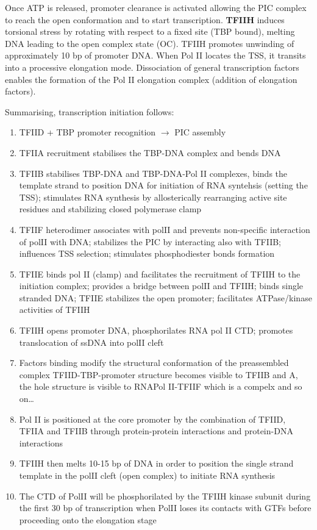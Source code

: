 Once ATP is released, promoter clearance is activated allowing the PIC complex to reach the open conformation and to start transcription. \textbf{TFIIH} induces torsional stress by rotating with respect to a fixed site (TBP bound), melting DNA leading to the open complex state (OC). TFIIH promotes unwinding of approximately 10 bp of promoter DNA. When Pol II locates the TSS, it transits into a processive elongation mode. Dissociation of general transcription factors enables the formation of the Pol II elongation complex (addition of elongation factors).

Summarising, transcription initiation follows:

\begin{enumerate}
\def\labelenumi{\arabic{enumi}.}
\tightlist
\item
  TFIID + TBP promoter recognition $\rightarrow$ PIC assembly
\item
  TFIIA recruitment stabilises the TBP-DNA complex and bends DNA
\item
  TFIIB stabilises TBP-DNA and TBP-DNA-Pol II complexes, binds the template strand to position DNA for initiation of RNA syntehsis (setting the TSS); stimulates RNA synthesis by allosterically rearranging active site residues and stabilizing closed polymerase clamp
\item
  TFIIF heterodimer associates with polII and prevents non-specific interaction of polII with DNA; stabilizes the PIC by interacting also with TFIIB; influences TSS selection; stimulates phosphodiester bonds formation
\item
  TFIIE binds pol II (clamp) and facilitates the recruitment of TFIIH to the initiation complex; provides a bridge between polII and TFIIH; binds single stranded DNA; TFIIE stabilizes the open promoter; facilitates ATPase/kinase activities of TFIIH
\item
  TFIIH opens promoter DNA, phosphorilates RNA pol II CTD; promotes translocation of ssDNA into polII cleft
\item
  Factors binding modify the structural conformation of the preassembled complex TFIID-TBP-promoter structure becomes visible to TFIIB and A, the hole structure is visible to RNAPol II-TFIIF which is a compelx and so on\ldots{}
\item
  Pol II is positioned at the core promoter by the combination of TFIID, TFIIA and TFIIB through protein-protein interactions and protein-DNA interactions
\item
  TFIIH then melts 10-15 bp of DNA in order to position the single strand template in the polII cleft (open complex) to initiate RNA synthesis
\item
  The CTD of PolII will be phosphorilated by the TFIIH kinase subunit during the first 30 bp of transcription when PolII loses its contacts with GTFs before proceeding onto the elongation stage
\end{enumerate}

